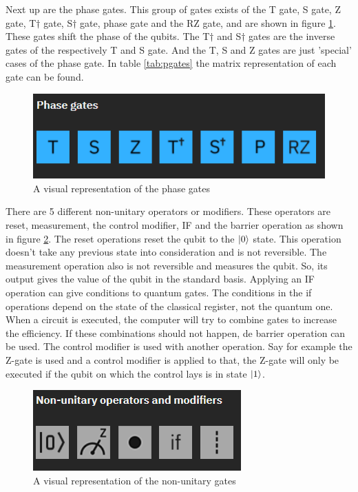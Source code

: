Next up are the phase gates. This group of gates exists of the T gate, S gate, Z gate, T$\dagger$ gate, S$\dagger$ gate, phase gate and the RZ gate, and are shown in figure \ref{fig:phase gates}. These gates shift the phase of the qubits.
The T$\dagger$ and S$\dagger$ gates are the inverse gates of the respectively T and S gate. And the T, S and Z gates are just 'special' cases of the phase gate.
In table \ref{tab:pgates} the matrix representation of each gate can be found.

\begin{figure} [h]
    \centering
    \includegraphics[width=\textwidth]{img/phase-gates.PNG}
        \caption{A visual representation of the phase gates \autocite{imggates}}
        \label{fig:phase gates}
\end{figure}

There are 5 different non-unitary operators or modifiers. These operators are reset, measurement, the control modifier, IF and the barrier operation as shown in figure \ref{fig:non-uni gates}.
The reset operations reset the qubit to the $\ket{0}$ state. This operation doesn't take any previous state into consideration and is not reversible.
The measurement operation also is not reversible and measures the qubit. So, its output gives the value of the qubit in the standard basis.
Applying an IF operation can give conditions to quantum gates. The conditions in the if operations depend on the state of the classical register, not the quantum one.
When a circuit is executed, the computer will try to combine gates to increase the efficiency. If these combinations should not happen, de barrier operation can be used.
The control modifier is used with another operation. Say for example the Z-gate is used and a control modifier is applied to that, the Z-gate will only be executed if the qubit on which the control lays is in state $\ket{1}$.

\begin{figure} [h]
    \centering
    \includegraphics[width=\textwidth]{img/non-unitary-gates.PNG}
        \caption{A visual representation of the non-unitary gates \autocite{imggates}}
        \label{fig:non-uni gates}
\end{figure}

